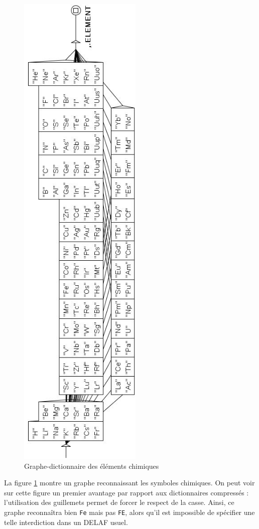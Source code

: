 \begin{figure}[!p]
\begin{center}
\includegraphics[height=24cm]{resources/img/fig3-12.png}
\caption{Graphe-dictionnaire des éléments chimiques\label{elements}}
\end{center}
\end{figure}

\bigskip
\noindent La figure \ref{elements} montre un graphe reconnaissant les symboles chimiques. On peut
voir sur cette figure un premier avantage par rapport aux dictionnaires compressés : l’utilisation
des guillemets permet de forcer le respect de la casse. Ainsi, ce graphe reconnaîtra bien \verb+Fe+
mais pas \verb+FE+, alors qu’il est impossible de spécifier une telle interdiction dans un DELAF
usuel.

